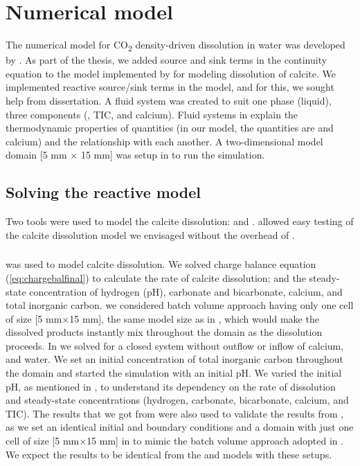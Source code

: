\chapter{Numerical model}\label{chapter:numericalmodel}
\thispagestyle{empty}

The numerical model for CO\textsubscript{2} density-driven dissolution in water was developed by 
\citet{Class2020}. As part of the thesis, we added source and sink terms in the continuity equation 
to the  model implemented by \citet{Class2020} for modeling dissolution of calcite. We implemented 
reactive source/sink terms in the model, and for this, we sought help from \citet{hommel2016modeling} dissertation. 
A fluid system was created to suit one phase (liquid), three components (, TIC, and calcium). 
Fluid systems in \DuMuX explain the thermodynamic properties of quantities (in our model, the quantities are 
 and calcium) and the relationship with each another. A two-dimensional model domain [5 mm $\times$ 15 mm] 
was setup in \DuMuX to run the simulation.

\section{Solving the reactive model}
Two tools were used to model the calcite dissolution: \MATLAB and \DuMuX. \MATLAB allowed easy testing of the 
calcite dissolution model we envisaged without the overhead of \DuMuX.

\subsection{\MATLAB} \label{ssec:matlabIntro}
\MATLAB was used to model calcite dissolution. We solved charge balance equation (\ref{eq:chargebalfinal}) 
to calculate the rate of calcite dissolution; and the steady-state concentration of hydrogen (pH), carbonate and bicarbonate, 
calcium, and total inorganic carbon. we considered batch volume approach having only one cell of size [5 mm$\times$15 mm], 
the same model size as in \DuMuX , which would make the dissolved products instantly mix throughout the domain as 
the dissolution proceeds. In \MATLAB we solved for a closed system without outflow or inflow of calcium,  and water. 
We set an initial concentration of total inorganic carbon throughout the domain and started the simulation with an initial pH. 
We varied the initial pH, as mentioned in , to understand its dependency on the rate of dissolution and 
steady-state concentrations (hydrogen, carbonate, bicarbonate, calcium, and TIC). The results that we got from \MATLAB were 
also used to validate the results from \DuMuX, as we set an identical initial and boundary conditions and a domain with just 
one cell of size [5 mm$\times$15 mm] in \DuMuX to mimic the batch volume approach adopted in \MATLAB. We expect the results 
to be identical from the \MATLAB and \DuMuX models with these setups. \\

